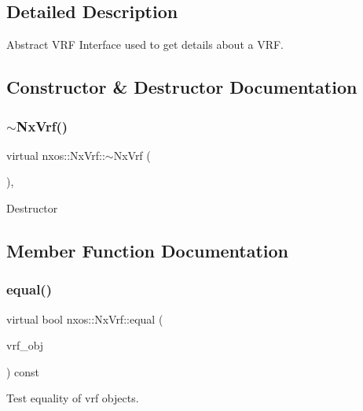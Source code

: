 \subsection{Detailed Description}
Abstract V\+RF Interface used to get details about a V\+RF. 

\subsection{Constructor \& Destructor Documentation}
\mbox{\label{classnxos_1_1_nx_vrf_ad5f50e3424b3d78304447600a3678e0b}} 
\subsubsection{\texorpdfstring{$\sim$\+Nx\+Vrf()}{~NxVrf()}}
{\footnotesize\ttfamily virtual nxos\+::\+Nx\+Vrf\+::$\sim$\+Nx\+Vrf (\begin{DoxyParamCaption}{ }\end{DoxyParamCaption})\hspace{0.3cm}{\ttfamily [inline]}, {\ttfamily [virtual]}}

Destructor 

\subsection{Member Function Documentation}
\mbox{\label{classnxos_1_1_nx_vrf_ade190af878a57a5f49a329fdffd6714e}} 
\subsubsection{\texorpdfstring{equal()}{equal()}}
{\footnotesize\ttfamily virtual bool nxos\+::\+Nx\+Vrf\+::equal (\begin{DoxyParamCaption}\item[{\mbox{\hyperlink{classnxos_1_1_nx_vrf}{Nx\+Vrf}} const \&}]{vrf\+\_\+obj }\end{DoxyParamCaption}) const\hspace{0.3cm}{\ttfamily [pure virtual]}}

Test equality of vrf objects.

